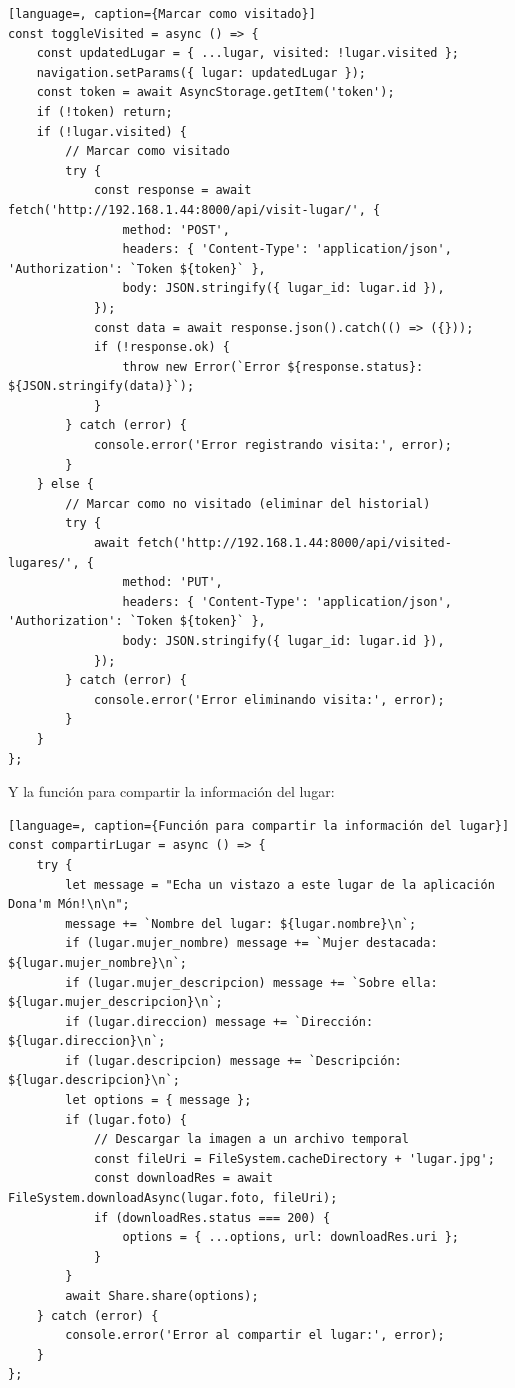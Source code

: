 \begin{lstlisting}[language=, caption={Marcar como visitado}]
const toggleVisited = async () => {
    const updatedLugar = { ...lugar, visited: !lugar.visited };
    navigation.setParams({ lugar: updatedLugar });
    const token = await AsyncStorage.getItem('token');
    if (!token) return;
    if (!lugar.visited) {
        // Marcar como visitado
        try {
            const response = await fetch('http://192.168.1.44:8000/api/visit-lugar/', {
                method: 'POST',
                headers: { 'Content-Type': 'application/json', 'Authorization': `Token ${token}` },
                body: JSON.stringify({ lugar_id: lugar.id }),
            });
            const data = await response.json().catch(() => ({}));
            if (!response.ok) {
                throw new Error(`Error ${response.status}: ${JSON.stringify(data)}`);
            }
        } catch (error) {
            console.error('Error registrando visita:', error);
        }
    } else {
        // Marcar como no visitado (eliminar del historial)
        try {
            await fetch('http://192.168.1.44:8000/api/visited-lugares/', {
                method: 'PUT',
                headers: { 'Content-Type': 'application/json', 'Authorization': `Token ${token}` },
                body: JSON.stringify({ lugar_id: lugar.id }),
            });
        } catch (error) {
            console.error('Error eliminando visita:', error);
        }
    }
};
\end{lstlisting}

Y la función para compartir la información del lugar:

\begin{lstlisting}[language=, caption={Función para compartir la información del lugar}]
const compartirLugar = async () => {
    try {
        let message = "Echa un vistazo a este lugar de la aplicación Dona'm Món!\n\n";
        message += `Nombre del lugar: ${lugar.nombre}\n`;
        if (lugar.mujer_nombre) message += `Mujer destacada: ${lugar.mujer_nombre}\n`;
        if (lugar.mujer_descripcion) message += `Sobre ella: ${lugar.mujer_descripcion}\n`;
        if (lugar.direccion) message += `Dirección: ${lugar.direccion}\n`;
        if (lugar.descripcion) message += `Descripción: ${lugar.descripcion}\n`;
        let options = { message };
        if (lugar.foto) {
            // Descargar la imagen a un archivo temporal
            const fileUri = FileSystem.cacheDirectory + 'lugar.jpg';
            const downloadRes = await FileSystem.downloadAsync(lugar.foto, fileUri);
            if (downloadRes.status === 200) {
                options = { ...options, url: downloadRes.uri };
            }
        }
        await Share.share(options);
    } catch (error) {
        console.error('Error al compartir el lugar:', error);
    }
};
\end{lstlisting}


